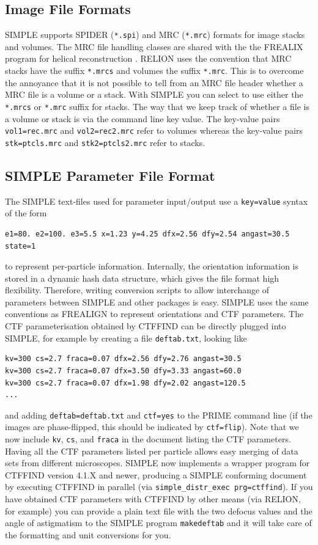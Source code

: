 \documentclass[a4paper,11pt]{article}
\newcommand{\prgname}[1]{\textcolor{NavyBlue}{\texttt{#1}}}
\begin{document}
\subsection{Image File Formats}
SIMPLE supports SPIDER (\texttt{*.spi}) and MRC (\texttt{*.mrc}) formats for image stacks and volumes. The MRC file handling classes are shared with the the FREALIX program for helical reconstruction \citep{Rohou:2014aa}. RELION \citep{Scheres:2012aa} uses the convention that MRC stacks have the suffix \texttt{*.mrcs} and volumes the suffix \texttt{*.mrc}. This is to overcome the annoyance that it is not possible to tell from an MRC file header whether a MRC file is a volume or a stack. With SIMPLE you can select to use either the \texttt{*.mrcs} or \texttt{*.mrc} suffix for stacks. The way that we keep track of whether a file is a volume or stack is via the command line key value. The key-value pairs \texttt{vol1=rec.mrc} and \texttt{vol2=rec2.mrc} refer to volumes whereas the key-value pairs \texttt{stk=ptcls.mrc} and \texttt{stk2=ptcls2.mrc} refer to stacks.

\subsection{SIMPLE Parameter File Format}
The SIMPLE text-files used for parameter input/output use a \texttt{key=value} syntax of the form
\begin{verbatim}
e1=80. e2=100. e3=5.5 x=1.23 y=4.25 dfx=2.56 dfy=2.54 angast=30.5 state=1
\end{verbatim}
to represent per-particle information. Internally, the orientation information is stored in a dynamic hash data structure, which gives the file format high flexibility. Therefore, writing conversion scripts to allow interchange of parameters between SIMPLE and other packages is easy. SIMPLE uses the same conventions as FREALIGN \citep{Grigorieff:2007aa} to represent orientations and CTF parameters. The CTF parameterisation obtained by CTFFIND \citep{Mindell:2003aa} can be directly plugged into SIMPLE, for example by creating a file \texttt{deftab.txt}, looking like
\begin{verbatim}
kv=300 cs=2.7 fraca=0.07 dfx=2.56 dfy=2.76 angast=30.5
kv=300 cs=2.7 fraca=0.07 dfx=3.50 dfy=3.33 angast=60.0
kv=300 cs=2.7 fraca=0.07 dfx=1.98 dfy=2.02 angast=120.5
...
\end{verbatim}
and adding \texttt{deftab=deftab.txt} and \texttt{ctf=yes} to the PRIME command line (if the images are phase-flipped, this should be indicated by \texttt{ctf=flip}). Note that we now include \texttt{kv}, \texttt{cs}, and \texttt{fraca} in the document listing the CTF parameters. Having all the CTF parameters listed per particle allows easy merging of data sets from different microscopes. SIMPLE now implements a wrapper program for CTFFIND version 4.1.X and newer, producing a SIMPLE conforming document by executing CTFFIND in parallel (via \texttt{simple\_distr\_exec prg=ctffind}). If you have obtained CTF parameters with CTFFIND by other means (via RELION, for example) you can provide a plain text file with the two defocus values and the angle of astigmatism to the SIMPLE program \prgname{makedeftab} and it will take care of the formatting and unit conversions for you.
\end{document}
